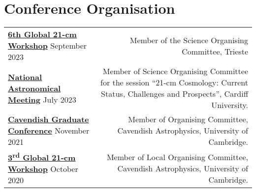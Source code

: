 \documentclass{article}
\begin{document}
\section*{Conference Organisation}

\begin{tabular}{l!{\vrule}r}
    \href{}{\textbf{6th Global 21-cm Workshop}} September 2023 & Member of the Science Organising Committee, Trieste \\
    \href{https://nam2023.org}{\textbf{National Astronomical Meeting}} July 2023 & Member of Science Organising Committee for the session “21-cm Cosmology: Current Status, Challenges and Prospects”, Cardiff University. \\
	\href{http://cavgradcon.soc.srcf.net/index.html}{\textbf{Cavendish Graduate Conference}} November 2021 & Member of Organising Committee, Cavendish Astrophysics, University of Cambridge.\\
	\href{https://sites.google.com/view/third21cmglobalworkshop/home?authuser=0}{\textbf{3\textsuperscript{rd} Global 21-cm Workshop}} October 2020 & Member of Local Organising Committee, Cavendish Astrophysics, University of Cambridge.	
\end{tabular}

\end{document}
